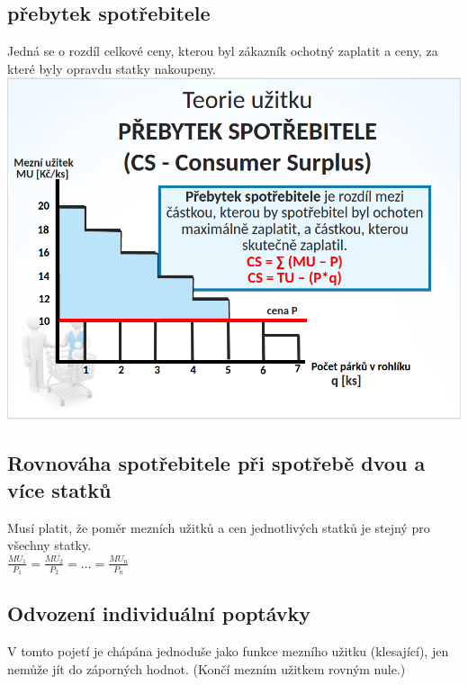 \subsection{přebytek spotřebitele}
Jedná se o rozdíl celkové ceny, kterou byl zákazník ochotný zaplatit a ceny, za které byly opravdu statky nakoupeny. \\
\includegraphics[width=16cm]{images/prebytek_spotrebitele.png}

\subsection{Rovnováha spotřebitele při spotřebě dvou a více statků}
Musí platit, že poměr mezních užitků a cen jednotlivých statků je stejný pro všechny statky. \\
$\frac{MU_1}{P_1}=\frac{MU_2}{P_2}=\dots=\frac{MU_n}{P_n}$

\subsection{Odvození individuální poptávky}
V tomto pojetí je chápána jednoduše jako funkce mezního užitku (klesající), jen nemůže jít do záporných hodnot. (Končí mezním užitkem rovným nule.)
